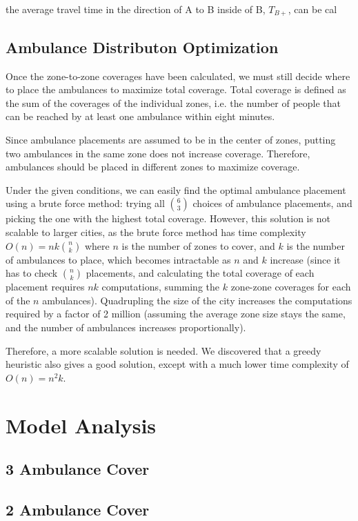 \documentclass[notitlepage, 12pt]{article}
\begin{document}
the average travel time in the direction of A to B inside of B, $T_{B+}$, can be cal

\subsection{Ambulance Distributon Optimization}
Once the zone-to-zone coverages have been calculated, we must still decide where to place
the ambulances to maximize total coverage. Total coverage is defined as the sum of the coverages
of the individual zones, i.e. the number of people that can be reached by at least one ambulance
within eight minutes.

Since ambulance placements are assumed to be in the center of zones, putting two ambulances in the same
zone does not increase coverage. Therefore, ambulances should be placed in different zones to maximize
coverage.

Under the given conditions, we can easily find the optimal ambulance placement using a brute force
method: trying all $\binom{6}{3}$ choices of ambulance placements, and picking the one with the highest total coverage.
However, this solution is not scalable to larger cities, as the brute force method has time complexity
$O(n) = nk\binom{n}{k}$ where $n$ is the number of zones to cover, and $k$ is the number of ambulances to place, which
becomes intractable as $n$ and $k$ increase (since it has to check $\binom{n}{k}$ placements,
and calculating the total coverage of each placement requires $nk$ computations, summing the $k$ zone-zone
coverages for each of the $n$ ambulances). Quadrupling the size of the city
increases the computations required by a factor of 2 million (assuming the average zone size stays the same,
and the number of ambulances increases proportionally).

Therefore, a more scalable solution is needed. We discovered that a greedy heuristic also gives a good solution,
except with a much lower time complexity of $O(n) = n^2k$.

\section{Model Analysis}

\subsection{3 Ambulance Cover}

\subsection{2 Ambulance Cover}
\end{document}
